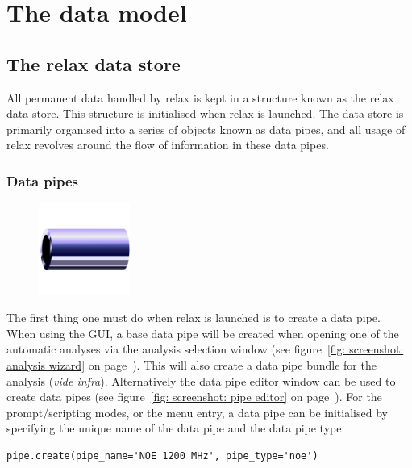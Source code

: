 
\section{The data model}



\subsection{The relax data store}

All permanent data handled by relax is kept in a structure known as the relax data store.
This structure is initialised when relax is launched.
The data store is primarily organised into a series of objects known as data pipes, and all usage of relax revolves around the flow of information in these data pipes.


\subsubsection{Data pipes}

\begin{figure}[h]
  \includegraphics[width=3cm, bb=0 0 1701 1701]{graphics/misc/pipe_600x600}
\end{figure}

The first thing one must do when relax is launched is to create a data pipe.
When using the GUI, a base data pipe will be created when opening one of the automatic analyses via the analysis selection window (see figure~\ref{fig: screenshot: analysis wizard} on page~\pageref{fig: screenshot: analysis wizard}).
This will also create a data pipe bundle for the analysis (\textit{vide infra}).
Alternatively the data pipe editor window can be used to create data pipes (see figure~\ref{fig: screenshot: pipe editor} on page~\pageref{fig: screenshot: pipe editor}).
For the prompt/scripting modes, or the  menu entry, a data pipe can be initialised by specifying the unique name of the data pipe and the data pipe type:

\begin{lstlisting}
pipe.create(pipe_name='NOE 1200 MHz', pipe_type='noe')
\end{lstlisting}

